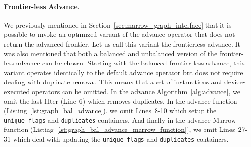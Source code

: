 \paragraph{\textbf{Frontier-less Advance}.}
We previously mentioned in Section~\ref{sec:marrow_graph_interface} that it is possible to invoke an optimized variant of the advance operator that does not return the advanced frontier. Let us call this variant the frontierless advance. It was also mentioned that both a balanced and unbalanced version of the frontier-less advance can be chosen. Starting with the balanced frontier-less advance, this variant operates identically to the default advance operator but does not require dealing with duplicate removal. This means that a set of instructions and device-executed operators can be omitted. In the advance Algorithm~\ref{alg:advance}, we omit the last filter (Line~6) which removes duplicates. In the advance function (Listing~\ref{lst:graph_bal_advance}), we omit Lines~8-10 which setup the \texttt{unique\_flags} and \texttt{duplicates} containers. And finally in the advance Marrow function (Listing~\ref{lst:graph_bal_advance_marrow_function}), we omit Lines~27-31 which deal with updating the \texttt{unique\_flags} and \texttt{duplicates} containers. 

